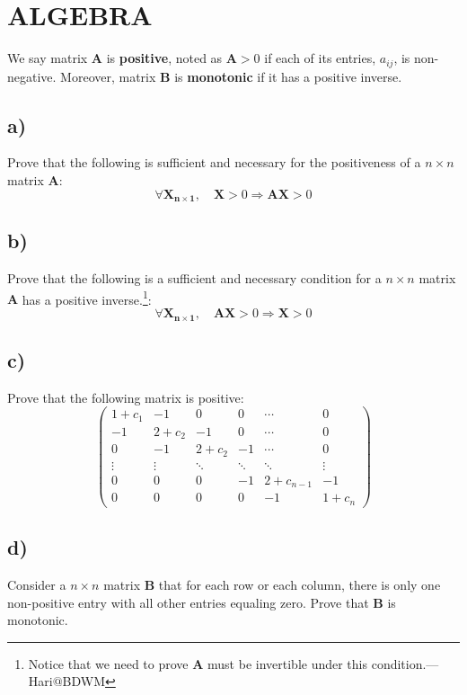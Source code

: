 \documentclass{article}
\begin{document}
\section{ALGEBRA}
We say matrix $\bm{A}$ is {\bf positive}, noted as $\bm{A}>0$ if each of its entries, $a_{ij}$, is non-negative. Moreover, matrix $\bm{B}$ is {\bf monotonic} if it has a positive inverse. 
\subsection*{a)}
Prove that the following is sufficient and necessary for the positiveness of a $n\times n$ matrix $\bm{A}$:
\begin{equation}
  \forall \bm{X_{n \times 1}}, \quad\bm{X}>0 \Rightarrow \bm{A}\bm{X}>0
\end{equation}

\subsection*{b)}
Prove that the following is a sufficient and necessary condition for a $n\times n$ matrix $\bm{A}$ has a positive inverse.\footnote{Notice that we need to prove $\bm{A}$ must be invertible under this condition.---Hari$@$BDWM}:
\begin{equation}
 \forall \bm{X_{n \times 1}}, \quad \bm{A}\bm{X}>0\Rightarrow \bm{X}>0 
\end{equation}
\subsection*{c)}
Prove that the following matrix is positive:
\begin{equation}
\left(
\begin{array}{cccccc}
 1+c_1 & -1 & 0 & 0 & \cdots  & 0 \\
 -1 & 2+c_2 & -1 & 0 & \cdots  & 0 \\
 0 & -1 & 2+c_2 & -1 & \cdots  & 0 \\
 \vdots  & \vdots  & \ddots & \ddots & \ddots & \vdots  \\
 0 & 0 & 0 & -1 & 2+c_{n-1} & -1 \\
 0 & 0 & 0 & 0 & -1 & 1+c_n
\end{array}
\right)
\end{equation}
\subsection*{d)}
Consider a $n \times n$ matrix $\bm{B}$ that for each row or each column, there is only one non-positive entry with all other entries equaling zero. Prove that $\bm{B}$ is monotonic.
\newpage
\end{document}
